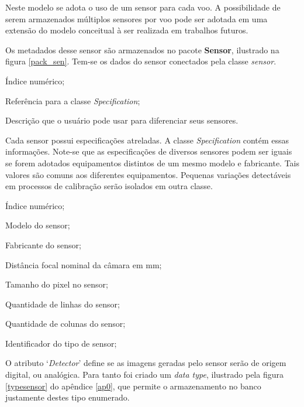 Neste modelo se adota o uso de um sensor para cada voo. A possibilidade de serem armazenados múltiplos sensores por voo pode ser adotada em uma extensão do modelo conceitual à ser realizada em trabalhos futuros. 

Os metadados desse sensor são armazenados no pacote \textbf{Sensor}, ilustrado na figura \ref{pack_sen}. Tem-se os dados do sensor conectados pela classe \textit{sensor}.

\begin{description}[labelwidth=2cm, itemsep=-0.3cm]
\item [Classe Sensor]
\item[Id:] Índice numérico;
\item[Id\_spec:] Referência para a classe \textit{Specification}; 
\item[Desc:] Descrição que o usuário pode usar para diferenciar seus sensores. 
\end{description}

Cada sensor possui especificações atreladas.  A classe \textit{Specification} contém essas informações. Note-se que as especificações de diversos sensores podem ser iguais se forem adotados equipamentos distintos de um mesmo modelo e fabricante. Tais valores são comuns aos diferentes equipamentos. Pequenas variações detectáveis em processos de calibração serão isolados em outra classe.

\begin{description}[labelwidth=2cm, itemsep=-0.3cm]
\item [Classe Specification]
\item[Id:] Índice numérico;
\item[Brand:] Modelo do sensor; 
\item[Manufact:] Fabricante do sensor;
\item[Focal:] Distância focal nominal da câmara em mm;
\item[Pixel\_size:] Tamanho do pixel no sensor; 
\item[Rows:] Quantidade de linhas do sensor;
\item[Cols:] Quantidade de colunas do sensor;
\item[Detector:] Identificador do tipo de sensor;
\end{description}

O atributo `\textit{Detector}' define se as imagens geradas pelo sensor serão de origem digital, ou analógica. Para tanto foi criado um \textit{data type}, ilustrado pela figura \ref{typesensor} do apêndice \ref{ap0}, que permite o armazenamento no banco justamente destes tipo enumerado.


